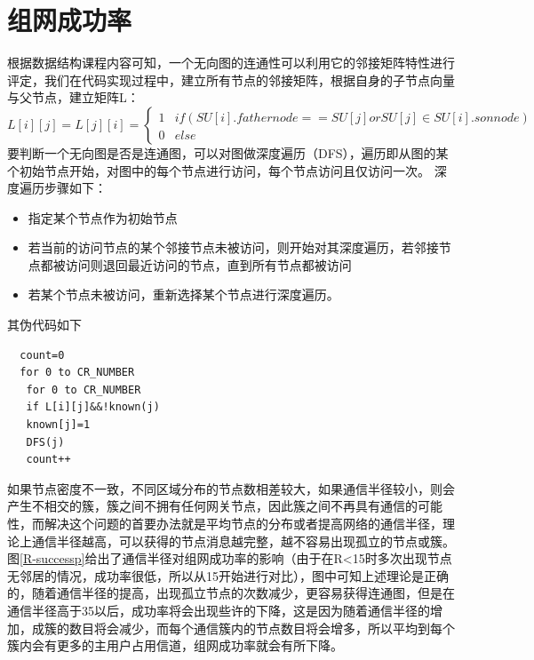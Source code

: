 \documentclass[a4paper,AutoFakeBold,oneside,12pt]{book}
\begin{document}
  \section{组网成功率}
  根据数据结构课程内容可知，一个无向图的连通性可以利用它的邻接矩阵特性进行评定，我们在代码实现过程中，建立所有节点的邻接矩阵，根据自身的子节点向量与父节点，建立矩阵L：
  \begin{equation}
  L[i][j]= L[j][i] =
\left\{  
             \begin{array}{lr}  
             1 &if (SU[i].fathernode==SU[j] or SU[j]\in SU[i].sonnode)  \\  
       
             0 &else
             \end{array}  
\right.  
\end{equation}
  要判断一个无向图是否是连通图，可以对图做深度遍历（DFS）\cite{shujujiegou}，遍历即从图的某个初始节点开始，对图中的每个节点进行访问，每个节点访问且仅访问一次。
  深度遍历步骤如下：
  \begin{itemize}
  \item 指定某个节点作为初始节点
  \item 若当前的访问节点的某个邻接节点未被访问，则开始对其深度遍历，若邻接节点都被访问则退回最近访问的节点，直到所有节点都被访问
  \item 若某个节点未被访问，重新选择某个节点进行深度遍历。
  \end{itemize}
  其伪代码如下
  \begin{lstlisting}
  count=0
  for 0 to CR_NUMBER
   for 0 to CR_NUMBER
   if L[i][j]&&!known(j)
   known[j]=1
   DFS(j)
   count++
\end{lstlisting}
  如果节点密度不一致，不同区域分布的节点数相差较大，如果通信半径较小，则会产生不相交的簇，簇之间不拥有任何网关节点，因此簇之间不再具有通信的可能性，而解决这个问题的首要办法就是平均节点的分布或者提高网络的通信半径，理论上通信半径越高，可以获得的节点消息越完整，越不容易出现孤立的节点或簇。图\ref{R-successp}给出了通信半径对组网成功率的影响（由于在R<15时多次出现节点无邻居的情况，成功率很低，所以从15开始进行对比），图中可知上述理论是正确的，随着通信半径的提高，出现孤立节点的次数减少，更容易获得连通图，但是在通信半径高于35以后，成功率将会出现些许的下降，这是因为随着通信半径的增加，成簇的数目将会减少，而每个通信簇内的节点数目将会增多，所以平均到每个簇内会有更多的主用户占用信道，组网成功率就会有所下降。
\end{document}
